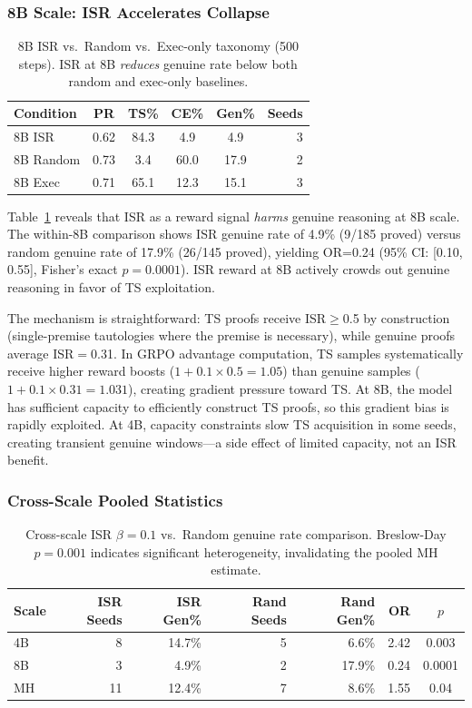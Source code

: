 \documentclass[11pt,a4paper]{article}
\begin{document}
\subsubsection{8B Scale: ISR Accelerates Collapse}

\begin{table}[t]
\centering
\caption{8B ISR vs.\ Random vs.\ Exec-only taxonomy (500 steps). ISR at 8B \emph{reduces} genuine rate below both random and exec-only baselines.}
\label{tab:8b-isr-comparison}
\small
\begin{tabular}{lccccr}
\toprule
Condition & PR & TS\% & CE\% & Gen\% & Seeds \\
\midrule
8B ISR & 0.62 & 84.3 & 4.9 & 4.9 & 3 \\
8B Random & 0.73 & 3.4 & 60.0 & 17.9 & 2 \\
8B Exec & 0.71 & 65.1 & 12.3 & 15.1 & 3 \\
\bottomrule
\end{tabular}
\end{table}

Table~\ref{tab:8b-isr-comparison} reveals that ISR as a reward signal \emph{harms} genuine reasoning at 8B scale.
The within-8B comparison shows ISR genuine rate of 4.9\% (9/185 proved) versus random genuine rate of 17.9\% (26/145 proved), yielding OR=0.24 (95\% CI: [0.10, 0.55], Fisher's exact $p=0.0001$).
ISR reward at 8B actively crowds out genuine reasoning in favor of TS exploitation.

The mechanism is straightforward: TS proofs receive ISR$\geq$0.5 by construction (single-premise tautologies where the premise is necessary), while genuine proofs average ISR$=$0.31.
In GRPO advantage computation, TS samples systematically receive higher reward boosts ($1 + 0.1 \times 0.5 = 1.05$) than genuine samples ($1 + 0.1 \times 0.31 = 1.031$), creating gradient pressure toward TS.
At 8B, the model has sufficient capacity to efficiently construct TS proofs, so this gradient bias is rapidly exploited.
At 4B, capacity constraints slow TS acquisition in some seeds, creating transient genuine windows---a side effect of limited capacity, not an ISR benefit.

\subsubsection{Cross-Scale Pooled Statistics}

\begin{table}[t]
\centering
\caption{Cross-scale ISR $\beta{=}0.1$ vs.\ Random genuine rate comparison. Breslow-Day $p=0.001$ indicates significant heterogeneity, invalidating the pooled MH estimate.}
\label{tab:cross-scale-or}
\small
\begin{tabular}{lrrrrrc}
\toprule
Scale & ISR Seeds & ISR Gen\% & Rand Seeds & Rand Gen\% & OR & $p$ \\
\midrule
4B & 8 & 14.7\% & 5 & 6.6\% & 2.42 & 0.003 \\
8B & 3 & 4.9\% & 2 & 17.9\% & 0.24 & 0.0001 \\
\midrule
MH & 11 & 12.4\% & 7 & 8.6\% & 1.55 & 0.04 \\
\bottomrule
\end{tabular}
\end{table}
\end{document}
